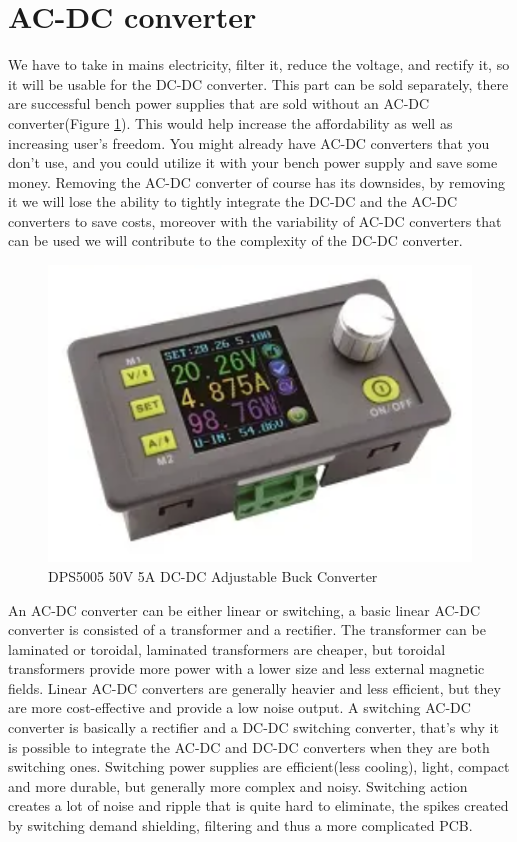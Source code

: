 \documentclass[a4paper, twocolumn]{article}
\begin{document}
\section{AC-DC converter}	
	We have to take in mains electricity, filter it, reduce the voltage, and rectify it, so it will be usable for the DC-DC converter. This part can be sold separately, there are successful bench power supplies that are sold without an AC-DC converter(Figure \ref{fig:dcdc}). This would help increase the affordability as well as increasing user's freedom. You might already have AC-DC converters that you don't use, and you could utilize it with your bench power supply and save some money. Removing the AC-DC converter of course has its downsides, by removing it we will lose the ability to tightly integrate the DC-DC and the AC-DC converters to save costs, moreover with the variability of AC-DC converters that can be used we will contribute to the complexity of the DC-DC converter. 
	\begin{figure}
		\includegraphics[width=\linewidth]{dcdc.png}
		\caption{DPS5005 50V 5A DC-DC Adjustable Buck Converter}
		\label{fig:dcdc}
	\end{figure}
	
	An AC-DC converter can be either linear or switching, a basic linear AC-DC converter is consisted of a transformer and a rectifier. The transformer can be laminated or toroidal, laminated transformers are cheaper, but toroidal transformers provide more power with a lower size and less external magnetic fields. Linear AC-DC converters are generally heavier and less efficient, but they are more cost-effective and provide a low noise output. A switching AC-DC converter is basically a rectifier and a DC-DC switching converter, that's why it is possible to integrate the AC-DC and DC-DC converters when they are both switching ones. Switching power supplies are efficient(less cooling), light, compact and more durable, but generally more complex and noisy. Switching action creates a lot of noise and ripple that is quite hard to eliminate, the spikes created by switching demand shielding, filtering and thus a more complicated PCB.
\end{document}
